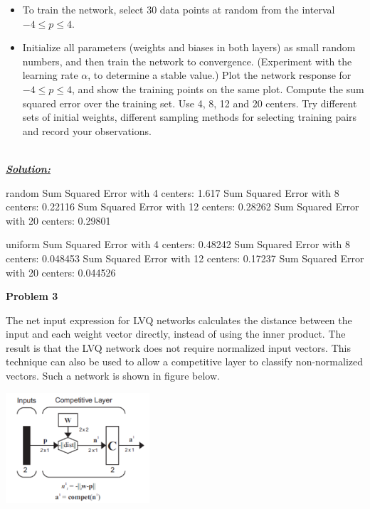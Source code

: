 \documentclass{article}
\begin{document}
\begin{itemize}
    \item To train the network, select 30 data points at random from the interval $-4 \leq p \leq 4$.
    \item Initialize all parameters (weights and biases in both layers) as small random numbers, 
    and then train the network to convergence. (Experiment with the learning rate $\alpha$, to 
    determine a stable value.) Plot the network response for $-4 \leq p \leq 4$, and show the 
    training points on the same plot. Compute the sum squared error over the training 
    set. Use 4, 8, 12 and 20 centers. Try different sets of initial weights, different 
    sampling methods for selecting training pairs and record your observations. \\ \\
\end{itemize}

\noindent \underline{\textbf{\textit{Solution:}}}

\noindent random
Sum Squared Error with 4 centers: 1.617
Sum Squared Error with 8 centers: 0.22116
Sum Squared Error with 12 centers: 0.28262
Sum Squared Error with 20 centers: 0.29801

uniform
Sum Squared Error with 4 centers: 0.48242
Sum Squared Error with 8 centers: 0.048453
Sum Squared Error with 12 centers: 0.17237
Sum Squared Error with 20 centers: 0.044526

\newpage
\noindent \textbf{Problem 3}

\noindent The net input expression for LVQ networks calculates the distance between the input 
and each weight vector directly, instead of using the inner product. The result is that the 
LVQ network does not require normalized input vectors. This technique can also be 
used to allow a competitive layer to classify non-normalized vectors. Such a network is 
shown in figure below.

\begin{center}
    \includegraphics[width=0.4\textwidth]{pr3.png}
\end{center}
\end{document}
